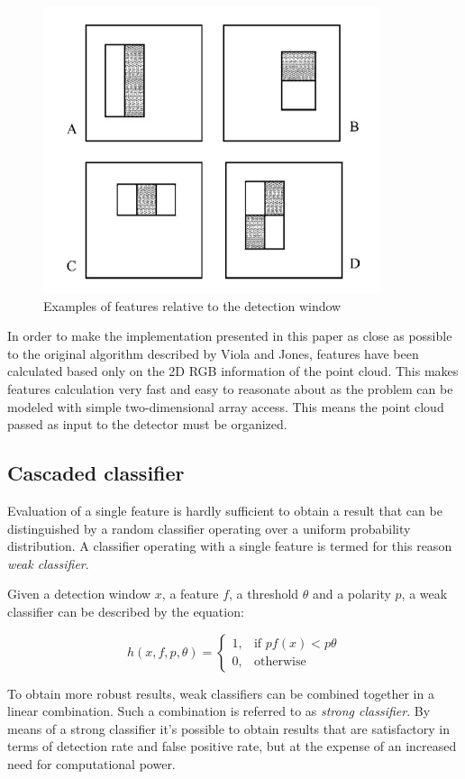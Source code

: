 \documentclass[a4paper,12pt,titlepage]{article}
\begin{document}
\begin{figure}[h]
  \centering
  \includegraphics[scale=1]{features.jpg}
  \caption{Examples of features relative to the detection window}
  \label{fig:features}
\end{figure}

In order to make the implementation presented in this paper as close as possible
to the original algorithm described by Viola and Jones, features have been
calculated based only on the 2D RGB information of the point cloud. This makes
features calculation very fast and easy to reasonate about as the problem can be
modeled with simple two-dimensional array access. This means the point cloud
passed as input to the detector must be organized.

\subsection{Cascaded classifier}
Evaluation of a single feature is hardly sufficient to obtain a result that can
be distinguished by a random classifier operating over a uniform probability
distribution. A classifier operating with a single feature is termed for this
reason \emph{weak classifier}.

Given a detection window $x$, a feature $f$, a threshold $\theta$ and a polarity
$p$, a weak classifier can be described by the equation:

\[ 
  h(x,f,p,\theta) = 
\begin{cases}
  1,& \text{if } pf(x) < p\theta \\ 0,& \text{otherwise}
\end{cases}
\]

To obtain more robust results, weak classifiers can be combined together in a
linear combination. Such a combination is referred to as \emph{strong
classifier}. By means of a strong classifier it's possible to obtain
results that are satisfactory in terms of detection rate and false positive
rate, but at the expense of an increased need for computational power.
\end{document}
